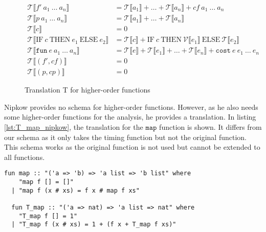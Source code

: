 \begin{figure}
  \begin{align*}
    \mathcal{T}\llbracket f'\ a_{1}\ \dots\ a_{n}\rrbracket &= \mathcal{T}\llbracket a_{1}\rrbracket + \dots + \mathcal{T}\llbracket a_{n}\rrbracket + cf\ a_{1}\ \dots\ a_{n}\\
    \mathcal{T}\llbracket p\ a_{1}\ \dots\ a_{n}\rrbracket &= \mathcal{T}\llbracket a_{1}\rrbracket + \dots + \mathcal{T}\llbracket a_{n}\rrbracket\\
    \mathcal{T}\llbracket c \rrbracket &= 0\\
    \mathcal{T}\llbracket \text{IF}\ c\ \text{THEN}\ e_{1}\ \text{ELSE}\ e_{2}\rrbracket &= \mathcal{T}\llbracket c\rrbracket + \text{IF}\  c\ \text{THEN}\ \mathcal{V}\llbracket e_{1}\rrbracket\ \text{ELSE}\ \mathcal{T}\llbracket e_{2}\rrbracket\\
    \mathcal{T}\llbracket\texttt{fun}\ e\ a_{1}\ \dots\ a_{n}\rrbracket &= \mathcal{T}\llbracket e\rrbracket + \mathcal{T}\llbracket e_{1}\rrbracket + \dots + \mathcal{T}\llbracket e_{n}\rrbracket + \texttt{cost}\ e\ e_{1}\ \dots\ e_{n}\\
    \mathcal{T}\llbracket (f',cf)\rrbracket &= 0\\
    \mathcal{T}\llbracket (p,cp)\rrbracket &= 0
  \end{align*}
  \caption{Translation T for higher-order functions}
  \label{fig:higher_T}
\end{figure}

Nipkow provides no schema for higher-order functions.
However, as he also needs some higher-order functions for the analysis, he provides a translation.
In listing \ref{lst:T_map_nipkow}, the translation for the $\texttt{map}$ function is shown.
It differs from our schema as it only takes the timing function but not the original function.
This schema works as the original function is not used but cannot be extended to all functions.
\begin{lstlisting}[language=isabelle,mathescape=true,caption=Translation of the function map to their timing function by Nipkow,label=lst:T_map_nipkow]
  fun map :: "('a => 'b) => 'a list => 'b list" where
    "map f [] = []"
  | "map f (x # xs) = f x # map f xs"

  fun T_map :: "('a => nat) => 'a list => nat" where
    "T_map f [] = 1"
  | "T_map f (x # xs) = 1 + (f x + T_map f xs)"
\end{lstlisting}
